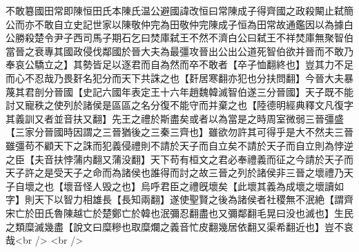 不敢簒國田常即陳恒田氏本陳氏温公避國諱改恒曰常陳成子得齊國之政殺闞止弑簡公而亦不敢自立史記世家以陳敬仲完為田敬仲完陳成子恒為田常故通鑑因以為據白公勝殺楚令尹子西司馬子期石乞曰焚庫弑王不然不濟白公曰弑王不祥焚庫無聚智伯當晉之衰專其國政侵伐鄰國於晉大夫為最彊攻晉出公出公道死智伯欲并晉而不敢乃奉哀公驕立之】其勢皆足以逐君而自為然而卒不敢者【卒子恤翻終也】豈其力不足而心不忍哉乃畏姧名犯分而天下共誅之也【姧居寒翻亦犯也分扶問翻】今晉大夫暴蔑其君剖分晉國【史記六國年表定王十六年趙魏韓滅智伯遂三分晉國】天子既不能討又寵秩之使列於諸侯是區區之名分復不能守而并棄之也【陸德明經典釋文凡復字其義訓又者並音扶又翻】先王之禮於斯盡矣或者以為當是之時周室微弱三晉彊盛【三家分晉國時因謂之三晉猶後之三秦三齊也】雖欲勿許其可得乎是大不然夫三晉雖彊苟不顧天下之誅而犯義侵禮則不請於天子而自立矣不請於天子而自立則為悖逆之臣【夫音扶悖蒲内翻又蒲没翻】天下苟有桓文之君必奉禮義而征之今請於天子而天子許之是受天子之命而為諸侯也誰得而討之故三晉之列於諸侯非三晉之壞禮乃天子自壞之也【壞音怪人毁之也】烏呼君臣之禮旣壞矣【此壞其義為成壞之壞讀如字】則天下以智力相雄長【長知兩翻】遂使聖賢之後為諸侯者社稷無不泯絶【謂齊宋亡於田氏魯陳越亡於楚鄭亡於韓也泯彌忍翻盡也又彌鄰翻毛晃曰没也滅也】生民之類糜滅幾盡【說文曰糜糝也取糜爛之義音忙皮翻幾居依翻又渠希翻近也】豈不哀哉<br />
<br />
